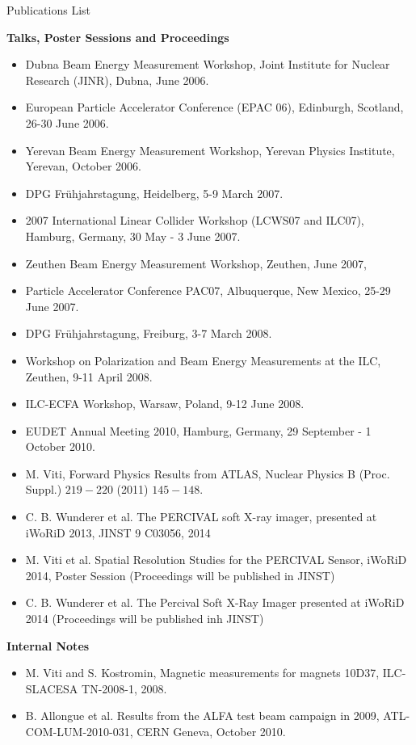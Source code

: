 \documentclass[a4paper,11pt]{article}
\begin{document}
\pagestyle{empty}
\begin{center}
  \huge{Publications List}
\end{center}
\vspace{1cm}
{\bfseries Talks, Poster Sessions and Proceedings}
\begin{itemize}
\item Dubna Beam Energy Measurement Workshop, Joint Institute for
  Nuclear Research (JINR), Dubna, June 2006.
\item European Particle Accelerator Conference (EPAC 06), Edinburgh,
  Scotland, 26-30 June 2006.
\item Yerevan Beam Energy Measurement Workshop, Yerevan Physics
  Institute, Yerevan, October 2006.
\item DPG Fr\"uhjahrstagung, Heidelberg, 5-9 March 2007.
\item 2007 International Linear Collider Workshop (LCWS07 and ILC07),
  Hamburg, Germany, 30 May - 3 June 2007.
\item Zeuthen Beam Energy Measurement Workshop, Zeuthen, June 2007,
\item Particle Accelerator Conference PAC07, Albuquerque, New Mexico,
  25-29 June 2007.
\item DPG Fr\"uhjahrstagung, Freiburg, 3-7 March 2008.
\item Workshop on Polarization and Beam Energy Measurements at the
  ILC, Zeuthen, 9-11 April 2008.
\item ILC-ECFA Workshop, Warsaw, Poland, 9-12 June 2008.
\item EUDET Annual Meeting 2010, Hamburg, Germany, 29 September - 1 October 2010.
\item M. Viti, Forward Physics Results from ATLAS, Nuclear Physics B
  (Proc. Suppl.) $219-220$ (2011) $145-148$.
\item C. B. Wunderer et al. The PERCIVAL soft X-ray imager, presented at iWoRiD 2013, JINST 9 C03056, 2014
\item M. Viti et al. Spatial Resolution Studies for the PERCIVAL Sensor, iWoRiD 2014, Poster Session (Proceedings will be published in JINST) 
\item  C. B. Wunderer et al. The Percival Soft X-Ray Imager presented at iWoRiD 2014 (Proceedings will be published inh JINST)
\end{itemize}
{\bfseries Internal Notes}
\begin{itemize}
\item M. Viti and S. Kostromin, Magnetic measurements for magnets
  10D37, ILC-SLACESA TN-2008-1, 2008.
\item B. Allongue et al. Results from the ALFA test beam campaign in
  2009, ATL-COM-LUM-2010-031, CERN Geneva, October 2010.
\end{itemize}
\end{document}
